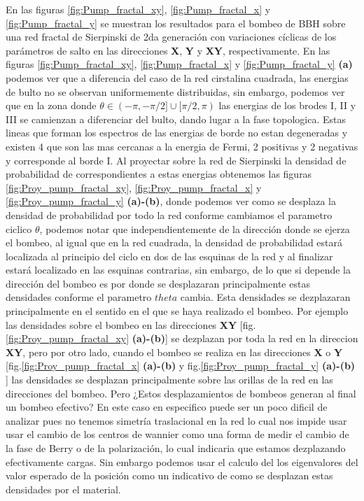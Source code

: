 En las figuras \ref{fig:Pump_fractal_xy}, \ref{fig:Pump_fractal_x} y \ref{fig:Pump_fractal_y} se muestran los resultados para el bombeo  de BBH sobre una red fractal de Sierpinski de 2da generación con variaciones cíclicas de los parámetros de salto en las direcciones \textbf{X}, \textbf{Y} y \textbf{XY}, respectivamente. En las figuras \ref{fig:Pump_fractal_xy}, \ref{fig:Pump_fractal_x} y \ref{fig:Pump_fractal_y} \textbf{(a)} podemos ver que a diferencia del caso de la red cirstalina cuadrada, las energias de bulto no se observan uniformemente distribuidas, sin embargo, podemos ver que en la zona donde $\theta \in (-\pi,-\pi/2] \cup [\pi/2,\pi)$ las energias de los brodes I, II y III se camienzan a diferenciar del bulto, dando lugar a la fase topologica. Estas lineas que forman los espectros de las energias de borde no estan degeneradas y existen 4 que son las mas cercanas a la energia de Fermi, 2 positivas y 2 negativas y corresponde al borde I. Al proyectar sobre la red de Sierpinski la densidad de probabilidad de correspondientes a estas energias obtenemos las figuras \ref{fig:Proy_pump_fractal_xy}, \ref{fig:Proy_pump_fractal_x} y  \ref{fig:Proy_pump_fractal_y} \textbf{(a)-(b)}, donde podemos ver como se desplaza la densidad de probabilidad por todo la red conforme cambiamos el parametro ciclico $\theta$, podemos notar que independientemente de la dirección donde se ejerza el bombeo, al igual que en la red cuadrada, la densidad de probabilidad estará localizada al principio del ciclo en dos de las esquinas de la red y al finalizar estará localizado en las esquinas contrarias, sin embargo, de lo que si depende la dirección del bombeo es por donde se desplazaran principalmente estas densidades conforme el parametro $theta$ cambia. Esta densidades se dezplazaran principalmente en el sentido en el que se haya realizado el bombeo. Por ejemplo las densidades sobre el bombeo en las direcciones \textbf{XY} [fig.\ref{fig:Proy_pump_fractal_xy}  \textbf{(a)-(b)}] se dezplazan por toda la red en la direccion \textbf{XY}, pero por otro lado, cuando el bombeo se realiza en las direcciones \textbf{X} o \textbf{Y} [fig.\ref{fig:Proy_pump_fractal_x}  \textbf{(a)-(b)} y fig.\ref{fig:Proy_pump_fractal_y}  \textbf{(a)-(b)} ] las densidades se desplazan principalmente sobre las orillas de la red en las direcciones del bombeo. Pero ¿Estos desplazamientos de bombeos generan al final un bombeo efectivo? En este caso en especifico puede ser un poco dificil de analizar pues no tenemos simetría traslacional en la red lo cual nos impide usar usar el cambio de los centros de wannier como una forma de medir el cambio de la fase de Berry o de la polarización, lo cual indicaria que estamos dezplazando efectivamente cargas. Sin embargo podemos usar el calculo del los eigenvalores del valor esperado de la posición como un indicativo de como se desplazan estas densidades por el material. 



















